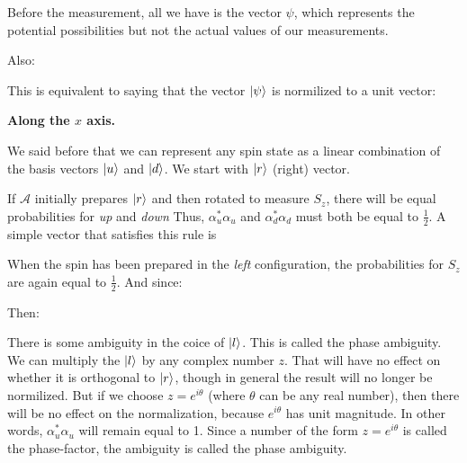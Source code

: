 \documentclass{article}
\begin{document}

Before the measurement, all we have is the vector $\psi$, which represents the potential possibilities but not the actual values of our measurements.

Also:


This is equivalent to saying that the vector $\ket{\psi}$ is normilized to a unit vector:



\textbf{Along the $x$ axis.}

We said before that we can represent any spin state as a linear combination of the basis vectors $\ket{u}$ and $\ket{d}$. We start with $\ket{r}$ (right) vector.

If $\mathcal{A}$ initially prepares $\ket{r}$ and then rotated to measure $S_z$, there will be equal probabilities for \textit{up} and \textit{down} Thus, $\alpha_{u}^{*}\alpha_{u}$ and $\alpha_{d}^{*}\alpha_{d}$ must both be equal to $\frac{1}{2}$. A  simple vector that satisfies this rule is


When the spin has been prepared in the \textit{left} configuration, the probabilities for $S_z$ are again equal to $\frac{1}{2}$. And since:


Then:



There is some ambiguity in the coice of $\ket{l}$. This is called the phase ambiguity. We can multiply the $\ket{l}$ by any complex number $z$. That will have no effect on whether it is orthogonal to $\ket{r}$, though in general the result will no longer be normilized. But if we choose $z = e^{i\theta}$ (where $\theta$ can be any real number), then there will be no effect on the normalization, because $e^{i\theta}$ has unit magnitude. In other words, $\alpha_{u}^{*}\alpha_{u}$ will remain equal to 1. Since a number of the form $z = e^{i\theta}$ is called the phase-factor, the ambiguity is called the phase ambiguity.
\end{document}
